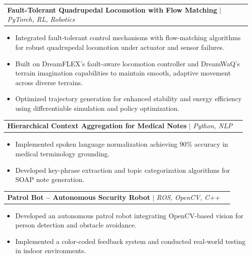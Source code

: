\documentclass[letterpaper,11pt]{article}
\makeatletter
\newcommand{\resumeItem}[1]{
  \item\small{
    {#1 \vspace{-2pt}}
  }
}
\newcommand{\resumeProjectHeading}[2]{
    \item
    \begin{tabular*}{0.97\textwidth}{l@{\extracolsep{\fill}}r}
      \small#1 & #2 \\
    \end{tabular*}\vspace{-7pt}
}
\newcommand{\resumeItemListStart}{\begin{itemize}}
\newcommand{\resumeItemListEnd}{\end{itemize}\vspace{-5pt}}
\makeatother
\begin{document}
  \resumeProjectHeading
    {\textbf{Fault-Tolerant Quadrupedal Locomotion with Flow Matching} $|$ \emph{PyTorch, RL, Robotics}}{}
    \resumeItemListStart
      \resumeItem{Integrated fault-tolerant control mechanisms with flow-matching algorithms for robust quadrupedal locomotion under actuator and sensor failures.}
      \resumeItem{Built on DreamFLEX's fault-aware locomotion controller and DreamWaQ's terrain imagination capabilities to maintain smooth, adaptive movement across diverse terrains.}
      \resumeItem{Optimized trajectory generation for enhanced stability and energy efficiency using differentiable simulation and policy optimization.}
    \resumeItemListEnd



  \resumeProjectHeading
    {\textbf{Hierarchical Context Aggregation for Medical Notes} $|$ \emph{Python, NLP}}{}
    \resumeItemListStart
      \resumeItem{Implemented spoken language normalization achieving 90\% accuracy in medical terminology grounding.}
      \resumeItem{Developed key-phrase extraction and topic categorization algorithms for SOAP note generation.}
    \resumeItemListEnd

  \resumeProjectHeading
    {\textbf{Patrol Bot – Autonomous Security Robot} $|$ \emph{ROS, OpenCV, C++}}{}
    \resumeItemListStart
      \resumeItem{Developed an autonomous patrol robot integrating OpenCV-based vision for person detection and obstacle avoidance.}
      \resumeItem{Implemented a color-coded feedback system and conducted real-world testing in indoor environments.}
    \resumeItemListEnd

\end{document}
